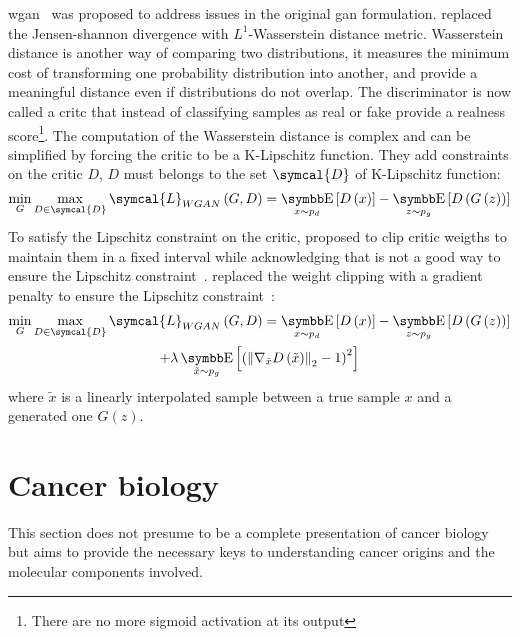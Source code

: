 \documentclass[../main.tex]{subfiles}
\begin{document}
		\Gls{wgan}~\cite{WGAN} was proposed to address issues in the original \gls{gan} formulation. 
		\citeauthor{WGAN} replaced the Jensen-shannon divergence with \(L^{1}\)-Wasserstein distance metric. 
		Wasserstein distance is another way of comparing two distributions, it measures the minimum cost of transforming one probability distribution into another, and provide a meaningful distance even if distributions do not overlap. 
		The discriminator is now called a critc that instead of classifying samples as real or fake provide a realness score\footnote{There are no more sigmoid activation at its output}.
		The computation of the Wasserstein distance is complex and can be simplified by forcing the critic to be a K-Lipschitz function. 
		They add constraints on the critic \(D\), \(D\) must belongs to the set \( \symcal{D}\) of K-Lipschitz function:
		\begin{equation}
			\min_{G} \max_{D\in \symcal{D}} \symcal{L}_{WGAN}\left(G,D\right) = \E_{x\sim p_{d}}\left[ D\left(x\right)\right] - \E_{z\sim p_{g}}\left[ D\left(G\left(z\right)\right)\right] \label{eq:wgan_loss}
		\end{equation}
		To satisfy the Lipschitz constraint on the critic, \citeauthor{WGAN} proposed to clip critic weigths to maintain them in a fixed interval while acknowledging that is not a good way to ensure the Lipschitz constraint~\cite{WGAN}.
		\citeauthor{WGANGP} replaced the weight clipping with a gradient penalty to ensure the Lipschitz constraint~\cite{WGANGP}:
		\begin{multline}
			\min_{G} \max_{D\in \symcal{D}} \symcal{L}_{WGAN}\left(G,D\right) = \E_{x\sim p_{d}}\left[ D\left(x\right)\right] - \E_{z\sim p_{g}}\left[ D\left(G\left(z\right)\right)\right] \\ + \lambda \E_{\tilde{x}\sim p_{g}}\left[ {\left( {\left\|\nabla_{\tilde{x}}D\left(\tilde{x}\right) \right\|}_{2} -1 \right)}^{2}\right]  \label{eq:wgangp_loss}
		\end{multline}
		where \(\tilde{x}\) is a linearly interpolated sample between a true sample \(x\) and a generated one \(G\left(z\right)\). 

\section{Cancer biology}
	This section does not presume to be a complete presentation of cancer biology but aims to provide the necessary keys to understanding cancer origins and the molecular components involved.
\end{document}
